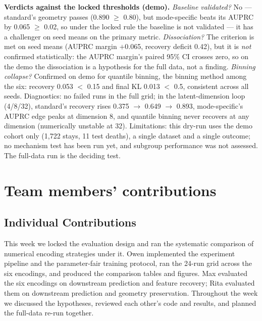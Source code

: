 \documentclass[onecolumn]{sigchi}
\begin{document}
\textbf{Verdicts against the locked thresholds (demo).}
\emph{Baseline validated?} No --- standard's geometry passes (0.890
$\geq$ 0.80), but mode-specific beats its AUPRC by 0.065 $\geq$ 0.02, so
under the locked rule the baseline is not validated --- it has a
challenger on seed means on the primary metric.
\emph{Dissociation?} The criterion is met on seed means (AUPRC margin
$+$0.065, recovery deficit 0.42), but it is \emph{not} confirmed
statistically: the AUPRC margin's paired 95\% CI crosses zero, so on the
demo the dissociation is a hypothesis for the full data, not a finding.
\emph{Binning collapse?} Confirmed on demo for quantile binning, the
binning method among the six: recovery 0.053 $<$ 0.15 and final KL 0.013
$<$ 0.5, consistent across all seeds.
Diagnostics: no failed runs in the full grid; in the latent-dimension loop
(4/8/32), standard's recovery rises 0.375 $\rightarrow$ 0.649 $\rightarrow$
0.893, mode-specific's AUPRC edge peaks at dimension 8, and quantile
binning never recovers at any dimension (numerically unstable at 32).
Limitations: this dry-run uses the demo cohort only (1,722 stays, 11
test deaths), a single dataset and a single outcome; no mechanism test has
been run yet, and subgroup performance was not assessed. The full-data
run is the deciding test.

\section{Team members' contributions}
\subsection{Individual Contributions}
This week we locked the evaluation design and ran the systematic
comparison of numerical encoding strategies under it. Owen implemented
the experiment pipeline and the parameter-fair training protocol, ran
the 24-run grid across the six encodings, and produced the comparison
tables and figures.
Max evaluated the six encodings on downstream prediction and feature
recovery; Rita evaluated them on downstream prediction and geometry
preservation. Throughout the week we discussed the
hypotheses, reviewed each other's code and results, and planned the
full-data re-run together.
\end{document}
